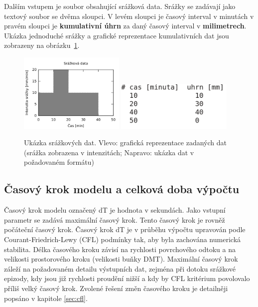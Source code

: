 Dalším vstupem je soubor obsahující srážková data. 
% 
% 
% 
Srážky se zadávají jako textový soubor se dvěma sloupci. V levém sloupci je časový interval v minutách v pravém sloupci je \textbf{kumulativní úhrn} za daný časový interval v \textbf{milimetrech}. Ukázka jednoduché srážky a grafické reprezentace kumulativních dat jsou zobrazeny na obrázku~\ref{fig:srazkovysoubor}. 
\begin{figure}
  \centering
  \includegraphics[width=0.45\textwidth]{./img/srazka-graf.png}
  \includegraphics[width=0.5\textwidth]{./img/srazka-soubor.png}
  \caption{Ukázka srážkových dat. Vlevo: grafická reprezentace zadaných dat (srážka zobrazena v intenzitách; Napravo: ukázka dat v požadovaném formátu)}
  \label{fig:srazkovysoubor}
\end{figure}














\subsection{Časový krok modelu a celková doba výpočtu} \label{sec:vstupkrok}

Časový krok modelu označený \acs{dT} je hodnota v sekundách. Jako vstupní parametr se zadává maximální časový krok. Tento časový krok je rovněž počáteční časový krok. Časový krok \acs{dT} je v průběhu výpočtu upravován podle Courant-Friedrich-Lewy (\acs{CFL}) podmínky tak, aby byla zachována numerická stabilita. Délka časového kroku závisí na rychlosti povrchového odtoku a na velikosti prostorového kroku (velikosti buňky DMT). Maximální časový krok záleží na požadovaném detailu výstupních dat, zejména při dotoku srážkové epizody, kdy jsou již rychlosti proudění nižší a kdy by \acs{CFL} kritérium povolovalo příliš velký časový krok. Zvolené řešení změn časového kroku je detailněji popsáno v kapitole \ref{sec:cfl}. 


